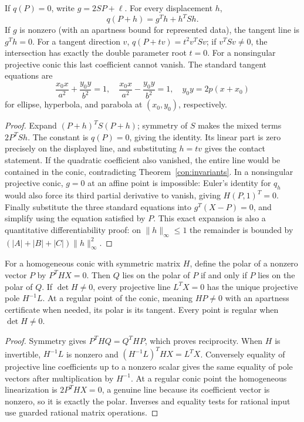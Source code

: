 \begin{theorem}\label{con:tangent}
If $q(P)=0$, write $g=2SP+\ell$. For every displacement $h$,
\[
 q(P+h)=g^Th+h^TSh.
\]
If $g$ is nonzero (with an apartness bound for represented data), the
tangent line is $g^Th=0$. For a tangent direction $v$,
$q(P+tv)=t^2v^TSv$; if $v^TSv\ne0$, the intersection has exactly the
double parameter root $t=0$. For a nonsingular projective conic this
last coefficient cannot vanish. The standard tangent equations are
\[
 \frac{x_0x}{a^2}+\frac{y_0y}{b^2}=1,\quad
 \frac{x_0x}{a^2}-\frac{y_0y}{b^2}=1,\quad
 y_0y=2p(x+x_0)
\]
for ellipse, hyperbola, and parabola at $(x_0,y_0)$, respectively.
\end{theorem}
\begin{proof}
Expand $(P+h)^TS(P+h)$; symmetry of $S$ makes the mixed terms
$2P^TSh$. The constant is $q(P)=0$, giving the identity.
Its linear part is zero precisely on the displayed line, and substituting
$h=tv$ gives the contact statement. If the quadratic coefficient also
vanished, the entire line would be contained in the conic, contradicting
Theorem~\ref{con:invariants}. In a nonsingular projective conic, $g=0$
at an affine point is impossible: Euler's identity for $q_h$ would
also force its third partial derivative to vanish, giving $H(P,1)^T=0$.
Finally substitute the three standard equations into $g^T(X-P)=0$,
and simplify using the equation satisfied by $P$.
This exact expansion is also a quantitative differentiability proof:
on $\|h\|_\infty\le1$ the remainder is bounded by
$(|A|+|B|+|C|)\|h\|_\infty^2$.
\end{proof}

\begin{proposition}\label{con:polar}
For a homogeneous conic with symmetric matrix $H$, define the polar of
a nonzero vector $P$ by $P^THX=0$. Then $Q$ lies on the polar of $P$
if and only if $P$ lies on the polar of $Q$. If $\det H\ne0$, every
projective line $L^TX=0$ has the unique projective pole $H^{-1}L$.
At a regular point of the conic, meaning $HP\ne0$ with an apartness
certificate when needed, its polar is its tangent. Every point is regular
when $\det H\ne0$.
\end{proposition}
\begin{proof}
Symmetry gives $P^THQ=Q^THP$, which proves reciprocity.
When $H$ is invertible, $H^{-1}L$ is nonzero and
$(H^{-1}L)^THX=L^TX$. Conversely equality of projective line
coefficients up to a nonzero scalar gives the same equality of pole
vectors after multiplication by $H^{-1}$. At a regular conic point the
homogeneous linearization is $2P^THX=0$, a genuine line because its
coefficient vector is nonzero, so it is exactly the polar.
Inverses and equality tests for rational input use guarded rational
matrix operations.
\end{proof}

